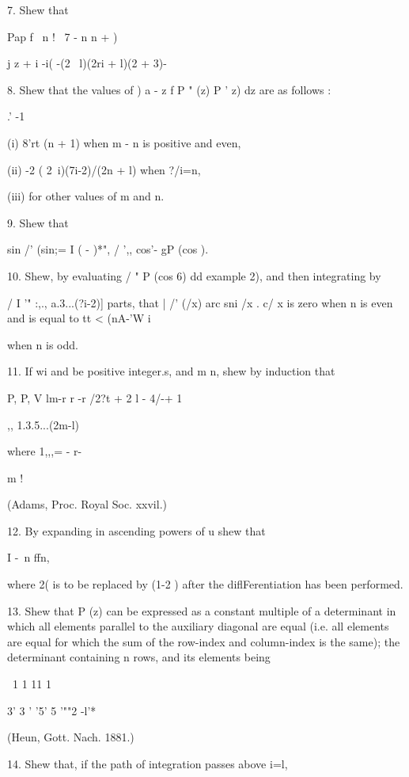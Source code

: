 {{{{7. Shew that

Pap f \ n ! \ 7 - n n + ) \

j z + i -i( -(2 \ l)(2ri + l)(2 + 3)-


8. Shew that the values of ) a - z f P " (z) P ' z) dz are as follows
:

.' -1

(i) 8'rt (n + 1) when m - n is positive and even,

(ii) -2 ( 2\ i)(7i-2)/(2n + l) when ?/i=n,

(iii) for other values of m and n. 

9. Shew that

sin /' (sin;= I ( - )*", / ',, cos'- gP (cos ).


10. Shew, by evaluating / " P (cos 6) dd  example 2), and then
integrating by

/ I '" :,., a.3...(?i-2)] parts, that | /' (/x) arc sni /x . c/ x is
zero when n is even and is equal to tt < (nA-'W i

when n is odd. 

11. If wi and be positive integer.s, and m n, shew by induction that

P, P, V lm-r r -r /2?t + 2 l - 4/-+ 1 \

,, 1.3.5...(2m-l)

where 1,,,= - r- 

m !

(Adams, Proc. Royal Soc. xxvil.)

12. By expanding in ascending powers of u shew that

I -\ n ffn,

where 2( is to be replaced by (1-2 ) after the diflFerentiation has
been performed.

13. Shew that P (z) can be expressed as a constant multiple of a
determinant in which all elements parallel to the auxiliary diagonal
are equal (i.e. all elements are equal for which the sum of the
row-index and column-index is the same); the determinant containing n
rows, and its elements being

\ 1 1 11 1

3' 3 ' '5' 5 '""2 -l'*

(Heun, Gott. Nach. 1881.)

14. Shew that, if the path of integration passes above i=l,

}}}}
